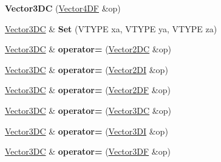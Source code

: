 \begin{DoxyCompactItemize}
\item 
\hypertarget{class_vector3_d_c_af33af4230f801fa3137c8478e6a89edd}{{\bfseries Vector3\+D\+C} (\hyperlink{class_vector4_d_f}{Vector4\+D\+F} \&op)}\label{class_vector3_d_c_af33af4230f801fa3137c8478e6a89edd}

\item 
\hypertarget{class_vector3_d_c_ad2bffce3587b2c90d424b3ed39ad17f0}{\hyperlink{class_vector3_d_c}{Vector3\+D\+C} \& {\bfseries Set} (V\+T\+Y\+P\+E xa, V\+T\+Y\+P\+E ya, V\+T\+Y\+P\+E za)}\label{class_vector3_d_c_ad2bffce3587b2c90d424b3ed39ad17f0}

\item 
\hypertarget{class_vector3_d_c_a6ca0e9c89f69b12b1fd071c029ac185c}{\hyperlink{class_vector3_d_c}{Vector3\+D\+C} \& {\bfseries operator=} (\hyperlink{class_vector2_d_c}{Vector2\+D\+C} \&op)}\label{class_vector3_d_c_a6ca0e9c89f69b12b1fd071c029ac185c}

\item 
\hypertarget{class_vector3_d_c_a2e77a1e94ed1853655c8b0bd6525e96f}{\hyperlink{class_vector3_d_c}{Vector3\+D\+C} \& {\bfseries operator=} (\hyperlink{class_vector2_d_i}{Vector2\+D\+I} \&op)}\label{class_vector3_d_c_a2e77a1e94ed1853655c8b0bd6525e96f}

\item 
\hypertarget{class_vector3_d_c_a1dbddd9516cde3b6f4b78e2d003fbf3c}{\hyperlink{class_vector3_d_c}{Vector3\+D\+C} \& {\bfseries operator=} (\hyperlink{class_vector2_d_f}{Vector2\+D\+F} \&op)}\label{class_vector3_d_c_a1dbddd9516cde3b6f4b78e2d003fbf3c}

\item 
\hypertarget{class_vector3_d_c_a47f7367eef6df815a47415b846aa22ff}{\hyperlink{class_vector3_d_c}{Vector3\+D\+C} \& {\bfseries operator=} (\hyperlink{class_vector3_d_c}{Vector3\+D\+C} \&op)}\label{class_vector3_d_c_a47f7367eef6df815a47415b846aa22ff}

\item 
\hypertarget{class_vector3_d_c_a668c4230186c7a510df70635c76d5f92}{\hyperlink{class_vector3_d_c}{Vector3\+D\+C} \& {\bfseries operator=} (\hyperlink{class_vector3_d_i}{Vector3\+D\+I} \&op)}\label{class_vector3_d_c_a668c4230186c7a510df70635c76d5f92}

\item 
\hypertarget{class_vector3_d_c_ae731b9fd7efbba0f934560654f5c5520}{\hyperlink{class_vector3_d_c}{Vector3\+D\+C} \& {\bfseries operator=} (\hyperlink{class_vector3_d_f}{Vector3\+D\+F} \&op)}\label{class_vector3_d_c_ae731b9fd7efbba0f934560654f5c5520}


\end{DoxyCompactItemize}
